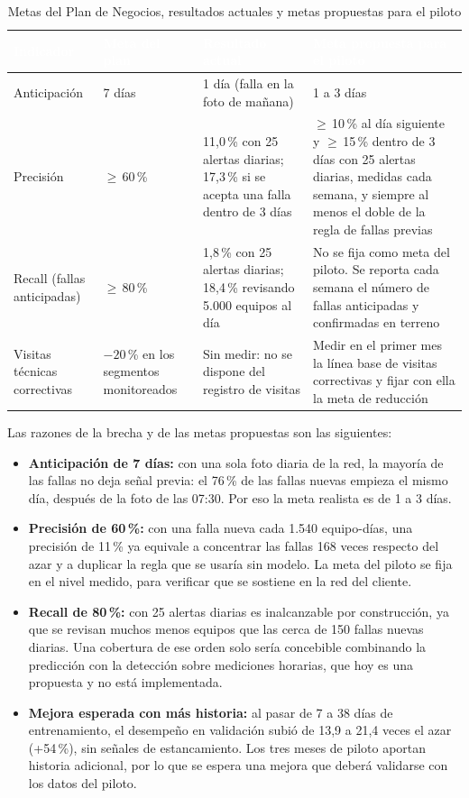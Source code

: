 \documentclass[12pt,a4paper]{article}
\begin{document}
\begin{table}[!htb]
\centering
\caption{Metas del Plan de Negocios, resultados actuales y metas propuestas para el piloto}
\label{tab:metas}
\small
\renewcommand{\arraystretch}{1.3}
\begin{tabularx}{\textwidth}{|Q{2.2cm}|Q{2.3cm}|Z|Z|}
\hline
{}
\textcolor{white}{\textbf{Indicador}} & \textcolor{white}{\textbf{Meta del plan}} & \textcolor{white}{\textbf{Resultado actual}} & \textcolor{white}{\textbf{Meta propuesta para el piloto}} \\ \hline
Anticipación & 7 días & 1 día (falla en la foto de mañana) & 1 a 3 días \\ \hline
Precisión & $\geq$\,60\,\% & 11,0\,\% con 25 alertas diarias; 17,3\,\% si se acepta una falla dentro de 3 días & $\geq$\,10\,\% al día siguiente y $\geq$\,15\,\% dentro de 3 días con 25 alertas diarias, medidas cada semana, y siempre al menos el doble de la regla de fallas previas \\ \hline
Recall (fallas anticipadas) & $\geq$\,80\,\% & 1,8\,\% con 25 alertas diarias; 18,4\,\% revisando 5.000 equipos al día & No se fija como meta del piloto. Se reporta cada semana el número de fallas anticipadas y confirmadas en terreno \\ \hline
Visitas técnicas correctivas & $-20$\,\% en los segmentos monitoreados & Sin medir: no se dispone del registro de visitas & Medir en el primer mes la línea base de visitas correctivas y fijar con ella la meta de reducción \\ \hline
\end{tabularx}
\end{table}

\noindent
Las razones de la brecha y de las metas propuestas son las siguientes:
\begin{itemize}
    \item \textbf{Anticipación de 7 días:} con una sola foto diaria de la red, la mayoría de las fallas no deja señal previa: el 76\,\% de las fallas nuevas empieza el mismo día, después de la foto de las 07:30. Por eso la meta realista es de 1 a 3 días.
    \item \textbf{Precisión de 60\,\%:} con una falla nueva cada 1.540 equipo-días, una precisión de 11\,\% ya equivale a concentrar las fallas 168 veces respecto del azar y a duplicar la regla que se usaría sin modelo. La meta del piloto se fija en el nivel medido, para verificar que se sostiene en la red del cliente.
    \item \textbf{Recall de 80\,\%:} con 25 alertas diarias es inalcanzable por construcción, ya que se revisan muchos menos equipos que las cerca de 150 fallas nuevas diarias. Una cobertura de ese orden solo sería concebible combinando la predicción con la detección sobre mediciones horarias, que hoy es una propuesta y no está implementada.
    \item \textbf{Mejora esperada con más historia:} al pasar de 7 a 38 días de entrenamiento, el desempeño en validación subió de 13,9 a 21,4 veces el azar (+54\,\%), sin señales de estancamiento. Los tres meses de piloto aportan historia adicional, por lo que se espera una mejora que deberá validarse con los datos del piloto.
\end{itemize}
\end{document}
